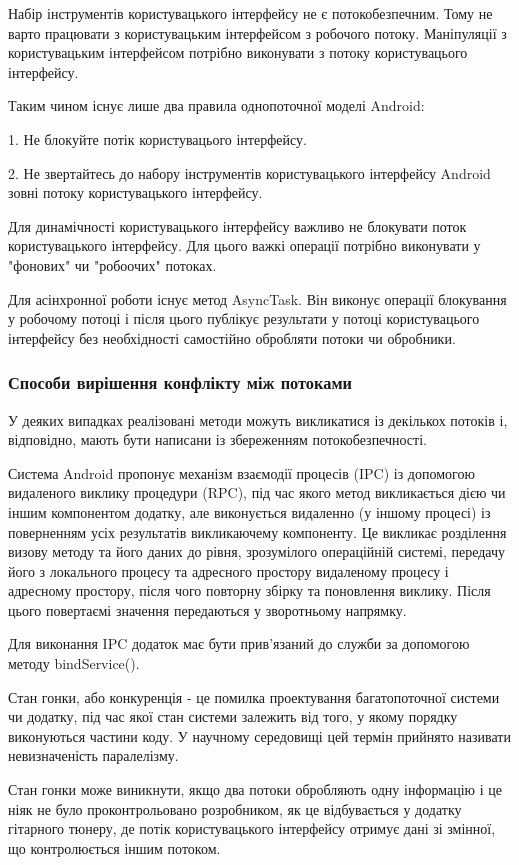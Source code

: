 Набір інструментів користувацького інтерфейсу не є потокобезпечним. Тому не варто працювати з користувацьким інтерфейсом з робочого потоку. Маніпуляції з користувацьким інтерфейсом потрібно виконувати з потоку користувацього інтерфейсу. 

Таким чином існує лише два правила однопоточної моделі Android:

1. Не блокуйте потік користувацього інтерфейсу.

2. Не звертайтесь до набору інструментів користувацького інтерфейсу Android зовні потоку користувацького інтерфейсу.

Для динамічності користувацького інтерфейсу важливо не блокувати поток користувацького інтерфейсу. Для цього важкі операції потрібно виконувати у "фонових" чи  "робоочих" потоках.

Для асінхронної роботи існує метод AsyncTask. Він виконує операції блокування у робочому потоці і після цього публікує результати у потоці користувацього інтерфейсу без необхідності самостійно обробляти потоки чи обробники. \cite{androiddevelopers}

\subsubsection{Способи вирішення конфлікту між потоками}

У деяких випадках реалізовані методи можуть викликатися із декількох потоків і, відповідно, мають бути написани із збереженням потокобезпечності.

Система Android пропонує механізм взаємодії процесів (IPC) із допомогою видаленого виклику процедури (RPC), під час якого метод викликається дією чи іншим компонентом додатку, але виконується видаленно (у іншому процесі) із поверненням усіх результатів викликаючему компоненту. Це викликає розділення визову методу та його даних до рівня, зрозумілого операційній системі, передачу його з локального процесу та адресного простору видаленому процесу і адресному простору, після чого повторну збірку та поновлення виклику. Після цього повертаємі значення передаються у зворотньому напрямку. 

Для виконання IPC додаток має бути прив'язаний до служби за допомогою методу bindService(). \cite{androiddevelopers}

Стан гонки, або конкуренція - це помилка проектування багатопоточної системи чи додатку, під час якої стан системи залежить від того, у якому порядку виконуються частини коду. У научному середовищі цей термін прийнято називати невизначеність паралелізму. \cite{jonathan2005linux}

Стан гонки може виникнути, якщо два потоки обробляють одну інформацію і це ніяк не було проконтрольовано розробником, як це відбувається у додатку гітарного тюнеру, де потік користувацького інтерфейсу отримує дані зі змінної, що контролюється іншим потоком.



